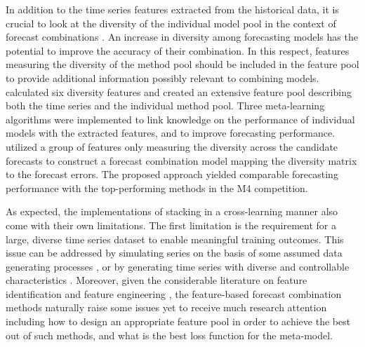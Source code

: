 \documentclass[a4paper,11pt]{article}
\newcommand{\pkg}[1]{{\normalfont\fontseries{b}\selectfont #1}}
\let\proglang=\textsf
\begin{document}
In addition to the time series features extracted from the historical data, it is crucial to look at the diversity of the individual model pool in the context of forecast combinations \citep{Batchelor1995-ps,Thomson2019-al,Atiya2020-ge,Lichtendahl2020-ut}. An increase in diversity among forecasting models has the potential to improve the accuracy of their combination. In this respect, features measuring the diversity of the method pool should be included in the feature pool to provide additional information possibly relevant to combining models. \citet{Lemke2010-wn} calculated six diversity features and created an extensive feature pool describing both the time series and the individual method pool. Three meta-learning algorithms were implemented to link knowledge on the performance of individual models with the extracted features, and to improve forecasting performance. \citet{Kang2021-ol} utilized a group of features only measuring the diversity across the candidate forecasts to construct a forecast combination model mapping the diversity matrix to the forecast errors. The proposed approach yielded comparable forecasting performance with the top-performing methods in the M4 competition.

As expected, the implementations of stacking in a cross-learning manner also come with their own limitations. The first limitation is the requirement for a large, diverse time series dataset to enable meaningful training outcomes. This issue can be addressed by simulating series on the basis of some assumed data generating processes \citep{Talagala2018-meta} \citep[implemented using the \proglang{R} package \pkg{forecast},][]{rforecast}, or by generating time series with diverse and controllable characteristics \citep{Kang2020-rl} \citep[implemented in the \proglang{R} package \pkg{gratis},][]{rgratis}. Moreover, given the considerable literature on feature identification and feature engineering \citep[e.g.,][]{Wang2009-hs,Kang2017-wt,Lemke2010-wn,Montero-Manso2020-tq,Li2020-od}, the feature-based forecast combination methods naturally raise some issues yet to receive much research attention including how to design an appropriate feature pool in order to achieve the best out of such methods, and what is the best loss function for the meta-model.
\end{document}
